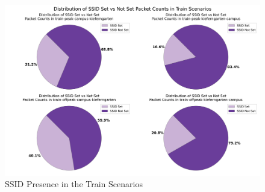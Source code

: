 \documentclass[sigconf,nonacm]{acmart}
\begin{document}
\begin{figure}
    \centering
    \includegraphics[width=\columnwidth]{images/part1/ssid/train-scenarios.png}
    \caption{SSID Presence in the Train Scenarios}
    \label{fig:ssid_presence_train}
\end{figure}
\end{document}
